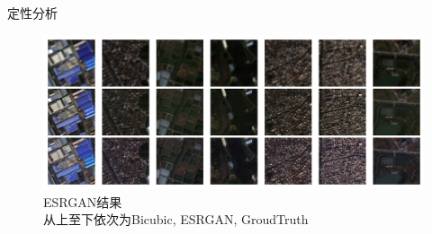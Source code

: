 \begin{frame}{定性分析}
    \begin{figure}
        \centering
        \includegraphics[width=\textwidth]{pic/chap0202.jpg}
        \caption{ESRGAN结果\\从上至下依次为Bicubic, ESRGAN, GroudTruth}
        \label{fig:0202}
    \end{figure}
\end{frame}

